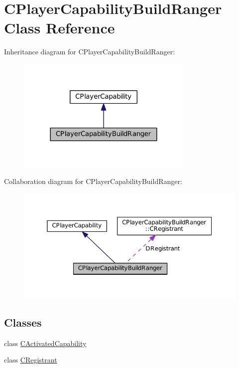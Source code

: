 \hypertarget{classCPlayerCapabilityBuildRanger}{}\section{C\+Player\+Capability\+Build\+Ranger Class Reference}
\label{classCPlayerCapabilityBuildRanger}


Inheritance diagram for C\+Player\+Capability\+Build\+Ranger\+:
\nopagebreak
\begin{figure}[H]
\begin{center}
\leavevmode
\includegraphics[width=240pt]{classCPlayerCapabilityBuildRanger__inherit__graph}
\end{center}
\end{figure}


Collaboration diagram for C\+Player\+Capability\+Build\+Ranger\+:
\nopagebreak
\begin{figure}[H]
\begin{center}
\leavevmode
\includegraphics[width=350pt]{classCPlayerCapabilityBuildRanger__coll__graph}
\end{center}
\end{figure}
\subsection*{Classes}
\begin{DoxyCompactItemize}
\item 
class \hyperlink{classCPlayerCapabilityBuildRanger_1_1CActivatedCapability}{C\+Activated\+Capability}
\item 
class \hyperlink{classCPlayerCapabilityBuildRanger_1_1CRegistrant}{C\+Registrant}
\end{DoxyCompactItemize}
